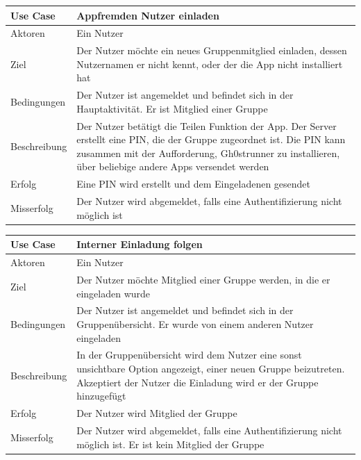 \begin{tabular}{|p{}|p{}|}
\hline
\textbf{Use Case} & \textbf{Appfremden Nutzer einladen} \\ \hline \hline
Aktoren &  Ein Nutzer \\ \hline
Ziel &  Der Nutzer möchte ein neues Gruppenmitglied einladen, dessen Nutzernamen er nicht kennt, oder der die App nicht installiert hat \\ \hline
Bedingungen &  Der Nutzer ist angemeldet und befindet sich in der Hauptaktivität. Er ist Mitglied einer Gruppe \\ \hline
Beschreibung & Der Nutzer betätigt die Teilen Funktion der App. Der Server erstellt eine PIN, die der Gruppe zugeordnet ist. Die PIN kann zusammen mit der Aufforderung, Gh0strunner zu installieren, über beliebige andere Apps versendet werden \\ \hline
Erfolg & Eine PIN wird erstellt und dem Eingeladenen gesendet \\ \hline
Misserfolg & Der Nutzer wird abgemeldet, falls eine Authentifizierung nicht möglich ist \\ \hline
\hline \end{tabular}
\begin{tabular}{|p{}|p{}|}
\hline
\textbf{Use Case} & \textbf{Interner Einladung folgen} \\ \hline \hline
Aktoren &  Ein Nutzer \\ \hline
Ziel &  Der Nutzer möchte Mitglied einer Gruppe werden, in die er eingeladen wurde \\ \hline
Bedingungen &  Der Nutzer ist angemeldet und befindet sich in der Gruppenübersicht. Er wurde von einem anderen Nutzer eingeladen \\ \hline
Beschreibung & In der Gruppenübersicht wird dem Nutzer eine sonst unsichtbare Option angezeigt, einer neuen Gruppe beizutreten. Akzeptiert der Nutzer die Einladung wird er der Gruppe hinzugefügt \\ \hline
Erfolg & Der Nutzer wird Mitglied der Gruppe \\ \hline
Misserfolg & Der Nutzer wird abgemeldet, falls eine Authentifizierung nicht möglich ist. Er ist kein Mitglied der Gruppe \\ \hline
\hline \end{tabular}
